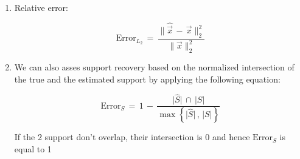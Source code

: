 \documentclass[12pt,a4paper]{book}
\begin{document}
\begin{enumerate}
    \item Relative error:
    
    \begin{equation}
        \text{Error}_{L_2} \, = \, \displaystyle\frac{\lVert  \hat{\vec{x}} \, - \, \vec{x} \rVert_2^2 }{\lVert \vec{x} \rVert_2^2}
    \end{equation}
    
    
\item We can also asses support recovery based on the normalized intersection of the true and the estimated support by applying the following equation:

\begin{equation}
 \text{Error}_{S} \, = \, 1 \, - \, \displaystyle\frac{\lvert \hat{S} \rvert \, \cap \, \lvert S \rvert}{\max \left\{ \lvert \hat{S} \rvert \, , \,  \lvert S \rvert  \right\} }  
\end{equation}
 
If the 2 support don't overlap, their intersection is 0 and hence $\text{Error}_{S}$ is equal to 1
\end{enumerate}








\end{document}
